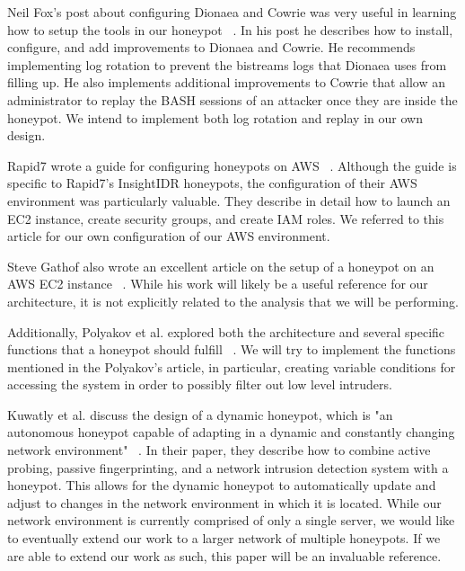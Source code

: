 Neil Fox's post about configuring Dionaea and Cowrie was very useful in learning how to setup the tools in our honeypot ~\cite{Fox}. In his post he describes how to install, configure, and add improvements to Dionaea and Cowrie. He recommends implementing log rotation to prevent the bistreams logs that Dionaea uses from filling up. He also implements additional improvements to Cowrie that allow an administrator to replay the BASH sessions of an attacker once they are inside the honeypot. We intend to implement both log rotation and replay in our own design.

Rapid7 wrote a guide for configuring honeypots on AWS ~\cite{Rapid7}. Although the guide is specific to Rapid7's InsightIDR honeypots, the configuration of their AWS environment was particularly valuable. They describe in detail how to launch an EC2 instance, create security groups, and create IAM roles. We referred to this article for our own configuration of our AWS environment. 

Steve Gathof also wrote an excellent article on the setup of a honeypot on an AWS EC2 instance ~\cite{Gathof}. While his work will likely be a useful reference for our architecture, it is not explicitly related to the analysis that we will be performing. 

Additionally, Polyakov et al. explored both the architecture and several specific functions that a honeypot should fulfill ~\cite{Polyakov2018ArchitectureOT}. We will try to implement the functions mentioned in the Polyakov's article, in particular, creating variable conditions for accessing the system in order to possibly filter out low level intruders.

Kuwatly et al. discuss the design of a dynamic honeypot, which is "an autonomous honeypot capable of adapting in a dynamic and constantly changing network environment" ~\cite{Dynamic}. In their paper, they describe how to combine active probing, passive fingerprinting, and a network intrusion detection system with a honeypot. This allows for the dynamic honeypot to automatically update and adjust to changes in the network environment in which it is located. While our network environment  is currently comprised of only a single server, we would like to eventually extend our work to a larger network of multiple honeypots. If we are able to extend our work as such, this paper will be an invaluable reference. 